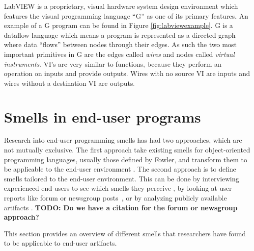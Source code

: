 \documentclass[10pt,conference,compsocconf]{IEEEtran}
\newcommand{\todo}[1]{\textbf{TODO: #1}}
\begin{document}
LabVIEW is a proprietary, visual hardware system design environment which features the visual programming language ``G'' as one of its primary features.
An example of a G program can be found in Figure \ref{fig:labviewexample}.
G is a dataflow language which means a program is represented as a directed graph where data ``flows'' between nodes through their edges.
As such the two most important primitives in G are the edges called \textit{wires} and nodes called \textit{virtual instruments}.
VI's are very similar to functions, because they perform an operation on inputs and provide outputs.
Wires with no source VI are inputs and wires without a destination VI are outputs. 


\section{Smells in end-user programs}
\label{sec:smells}
Research into end-user programming smells has had two approaches, which are not mutually exclusive.
The first approach take existing smells for object-oriented programming languages, usually those defined by Fowler, and transform them to be applicable to the end-user environment \cite{Hermans2012inter,Hermans2012intra,Stolee2011,StoleeTSE2013}.
The second approach is to define smells tailored to the end-user environment.
This can be done by interviewing experienced end-users to see which smells they perceive \cite{chambers2013smell}, by looking at user reports like forum or newsgroup posts~\cite{}, or by analyzing publicly available artifacts \cite{Stolee2011,StoleeTSE2013}. \todo{Do we have a citation for the forum or newsgroup approach?}

This section provides an overview of different smells that researchers have found to be applicable to end-user artifacts.
\end{document}
